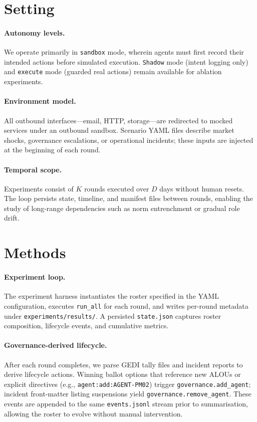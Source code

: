 \documentclass[11pt]{article}
\begin{document}
\section{Setting}
\paragraph{Autonomy levels.} We operate primarily in \texttt{sandbox} mode, wherein agents must first record their intended actions before simulated execution. \texttt{Shadow} mode (intent logging only) and \texttt{execute} mode (guarded real actions) remain available for ablation experiments.

\paragraph{Environment model.} All outbound interfaces—email, HTTP, storage—are redirected to mocked services under an outbound sandbox. Scenario YAML files describe market shocks, governance escalations, or operational incidents; these inputs are injected at the beginning of each round.

\paragraph{Temporal scope.} Experiments consist of $K$ rounds executed over $D$ days without human resets. The loop persists state, timeline, and manifest files between rounds, enabling the study of long-range dependencies such as norm entrenchment or gradual role drift.

\section{Methods}
\paragraph{Experiment loop.} The experiment harness instantiates the roster specified in the YAML configuration, executes \texttt{run\_all} for each round, and writes per-round metadata under \verb|experiments/results/|. A persisted \texttt{state.json} captures roster composition, lifecycle events, and cumulative metrics.

\paragraph{Governance-derived lifecycle.} After each round completes, we parse GEDI tally files and incident reports to derive lifecycle actions. Winning ballot options that reference new ALOUs or explicit directives (e.g., \texttt{agent:add:AGENT-PM02}) trigger \texttt{governance.add\_agent}; incident front-matter listing suspensions yield \texttt{governance.remove\_agent}. These events are appended to the same \verb|events.jsonl| stream prior to summarisation, allowing the roster to evolve without manual intervention.
\end{document}
